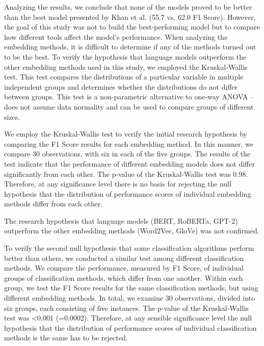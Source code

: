 Analyzing the results, we conclude that none of the models proved to be better than the best model presented by Khan et al. (55.7 vs. 62.0 F1 Score). However, the goal of this study was not to build the best-performing model but to compare how different tools affect the model's performance. When analyzing the embedding methods, it is difficult to determine if any of the methods turned out to be the best. To verify the hypothesis that language models outperform the other embedding methods used in this study, we employed the Kruskal-Wallis test. This test compares the distributions of a particular variable in multiple independent groups and determines whether the distributions do not differ between groups. This test is a non-parametric alternative to one-way ANOVA – does not assume data normality and can be used to compare groups of different sizes.

We employ the Kruskal-Wallis test to verify the initial research hypothesis by comparing the F1 Score results for each embedding method. In this manner, we compare 30 observations, with six in each of the five groups. The results of the test indicate that the performance of different embedding models does not differ significantly from each other. The p-value of the Kruskal-Wallis test was 0.98. Therefore, at any significance level there is no basis for rejecting the null hypothesis that the distribution of performance scores of individual embedding methods differ from each other.


The research hypothesis that language models (BERT, RoBERTa, GPT-2) outperform the other embedding methods (Word2Vec, GloVe) was not confirmed.

To verify the second null hypothesis that some classification algorithms perform better than others, we conducted a similar test among different classification methods. We compare the performance, measured by F1 Score, of individual groups of classification methods, which differ from one another. Within each group, we test the F1 Score results for the same classification methods, but using different embedding methods. In total, we examine 30 observations, divided into six groups, each consisting of five instances.
The p-value of the Kruskal-Wallis test was <0.001 (=0.0002). Therefore, at any sensible significance level the null hypothesis that the distribution of performance scores of individual classification methods is the same has to be rejected.

